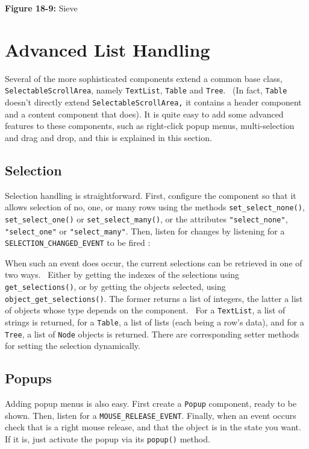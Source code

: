 {\sffamily\bfseries Figure 18-9:}
{\sffamily Sieve}

\section{Advanced List Handling}

Several of the more sophisticated components extend a common base class,
\texttt{SelectableScrollArea}, namely \texttt{TextList}, \texttt{Table}
and \texttt{Tree}. \ (In fact, \texttt{Table} doesn't
directly extend \texttt{SelectableScrollArea,} it contains a header
component and a content component that does). It is quite easy to add
some advanced features to these components, such as right-click popup
menus, multi-selection and drag and drop, and this is explained in this
section.

\subsection*{Selection}

Selection handling is straightforward. First, configure the component
so that it allows selection of no, one, or many rows using the methods
\texttt{set\_select\_none()}, \texttt{set\_select\_one()} or
\texttt{set\_select\_many()}, or the attributes
\texttt{"select\_none"}, \texttt{"select\_one"} or \texttt{"select\_many"}.
Then, listen for changes by listening for a
\texttt{SELECTION\_CHANGED\_EVENT} to be fired :


When such an event does occur, the current selections can be retrieved
in one of two ways. \ Either by getting the indexes of the selections
using \texttt{get\_selections()}, or by getting the objects selected,
using \texttt{object\_get\_selections()}. The former returns a list
of integers, the latter a list of objects whose type depends on the
component. \ For a \texttt{TextList}, a list of strings is returned,
for a \texttt{Table}, a list of lists (each being a
row's data), and for a \texttt{Tree}, a list of
\texttt{Node} objects is returned.
There are corresponding setter methods for setting the selection dynamically.


\subsection*{Popups}

Adding popup menus is also easy. First create a \texttt{Popup}
component, ready to be shown. Then, listen for a
\texttt{MOUSE\_RELEASE\_EVENT}. Finally, when an event occurs check
that is a right mouse release, and that the object is in the state you
want. If it is, just activate the popup via its \texttt{popup()}
method.


